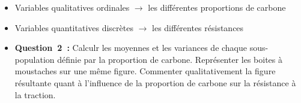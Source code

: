 \begin{itemize}
    \item Variables qualitatives ordinales $\to$ les différentes proportions de carbone
    \item Variables quantitatives discrètes $\to$ les différentes résistances
\end{itemize}


\vspace{.5cm}
\begin{itemize}[label={},itemindent=-2em,leftmargin=2em]
    \item \textbf{Question~2~:} Calculr les moyennes et les variances de chaque sous-population définie par la proportion
    de carbone. Représenter les boites à moustaches sur une même figure. Commenter qualitativement
    la figure résultante quant à l’influence de la proportion de carbone sur la résistance à la traction.
\end{itemize}
\vspace{.2cm}

\clearpage

